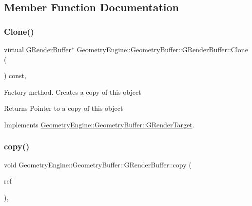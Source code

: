 \subsection{Member Function Documentation}
\mbox{\label{class_geometry_engine_1_1_geometry_buffer_1_1_g_render_buffer_a451303386c519d70d50875873dc7b1fc}} 
\subsubsection{\texorpdfstring{Clone()}{Clone()}}
{\footnotesize\ttfamily virtual \mbox{\hyperlink{class_geometry_engine_1_1_geometry_buffer_1_1_g_render_buffer}{G\+Render\+Buffer}}$\ast$ Geometry\+Engine\+::\+Geometry\+Buffer\+::\+G\+Render\+Buffer\+::\+Clone (\begin{DoxyParamCaption}{ }\end{DoxyParamCaption}) const\hspace{0.3cm}{\ttfamily [inline]}, {\ttfamily [virtual]}}

Factory method. Creates a copy of this object \begin{DoxyReturn}{Returns}
Pointer to a copy of this object 
\end{DoxyReturn}


Implements \mbox{\hyperlink{class_geometry_engine_1_1_geometry_buffer_1_1_g_render_target_a3b14d8929cf9d2acb6bc263c709ff019}{Geometry\+Engine\+::\+Geometry\+Buffer\+::\+G\+Render\+Target}}.

\mbox{\label{class_geometry_engine_1_1_geometry_buffer_1_1_g_render_buffer_ad747a5783a7c5cbae9f4ad9aea753896}} 
\subsubsection{\texorpdfstring{copy()}{copy()}}
{\footnotesize\ttfamily void Geometry\+Engine\+::\+Geometry\+Buffer\+::\+G\+Render\+Buffer\+::copy (\begin{DoxyParamCaption}\item[{const \mbox{\hyperlink{class_geometry_engine_1_1_geometry_buffer_1_1_g_render_buffer}{G\+Render\+Buffer}} \&}]{ref }\end{DoxyParamCaption})\hspace{0.3cm}{\ttfamily [protected]}, {\ttfamily [virtual]}}


